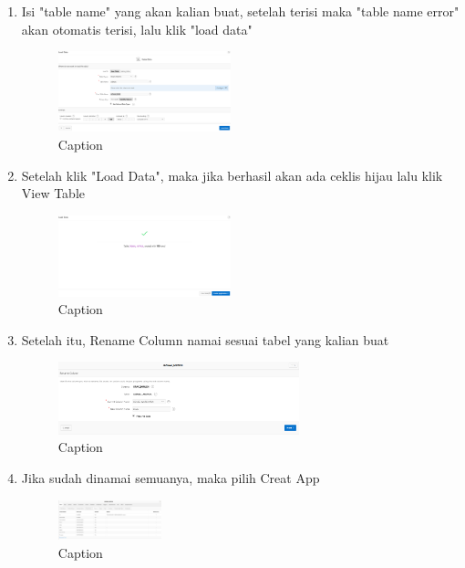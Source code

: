 \documentclass{article}
\begin{document}
\begin{enumerate}
    \item Isi "table name" yang akan kalian buat, setelah terisi maka "table name error" akan otomatis terisi, lalu klik "load data"
     \begin{figure}[!htbp]
        \centering
        \includegraphics [width=5cm]{figure/Capture4.PNG}
        \caption{Caption}
        \label{fig:my_label}
    \end{figure}
    
    \item Setelah klik "Load Data", maka jika berhasil akan ada ceklis hijau lalu klik View Table
     \begin{figure}[!htbp]
        \centering
        \includegraphics [width=5cm]{figure/Capture5.PNG}
        \caption{Caption}
        \label{fig:my_label}
    \end{figure}
    
    \item Setelah itu, Rename Column namai sesuai tabel yang kalian buat
     \begin{figure}[!htbp]
        \centering
        \includegraphics [width=7cm]{figure/Capture11.PNG}
        \caption{Caption}
        \label{fig:my_label}
    \end{figure}
    
    \item Jika sudah dinamai semuanya, maka pilih Creat App
     \begin{figure}[!htbp]
        \centering
        \includegraphics [width=3cm]{figure/Capture12.PNG}
        \caption{Caption}
        \label{fig:my_label}
    \end{figure}
    

\end{enumerate}
\end{document}

